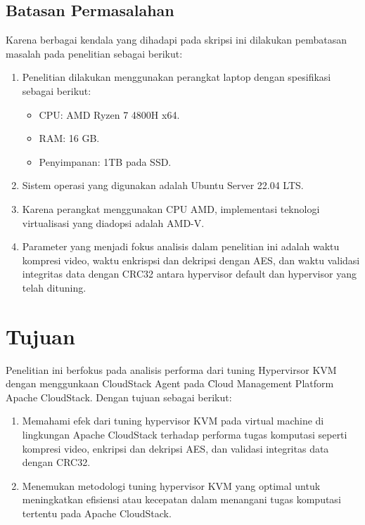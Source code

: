 \subsection{Batasan Permasalahan}
Karena berbagai kendala yang dihadapi pada skripsi ini dilakukan pembatasan masalah pada penelitian  sebagai berikut:
\begin{enumerate}
      \item Penelitian dilakukan menggunakan perangkat laptop dengan spesifikasi sebagai berikut:
            \begin{itemize}
                  \item CPU: AMD Ryzen 7 4800H x64.
                  \item RAM: 16 GB.
                  \item Penyimpanan: 1TB pada SSD.
            \end{itemize}
      \item Sistem operasi yang digunakan adalah Ubuntu Server 22.04 LTS.
      \item Karena perangkat menggunakan CPU AMD, implementasi teknologi virtualisasi yang diadopsi adalah AMD-V.
      \item Parameter yang menjadi fokus analisis dalam penelitian ini adalah waktu kompresi video, waktu enkrispsi dan dekripsi dengan AES, dan waktu validasi integritas data dengan CRC32 antara hypervisor default dan hypervisor yang telah dituning.
\end{enumerate}


\section{Tujuan}
Penelitian ini berfokus pada analisis performa dari tuning Hypervirsor KVM dengan menggunkaan CloudStack Agent pada \f{Cloud Management Platform} Apache CloudStack. Dengan tujuan sebagai berikut:

\begin{enumerate}
      \item  Memahami efek dari tuning hypervisor KVM pada virtual machine di lingkungan Apache CloudStack terhadap performa tugas komputasi seperti kompresi video, enkripsi dan dekripsi AES, dan validasi integritas data dengan CRC32.

      \item Menemukan metodologi tuning hypervisor KVM yang optimal untuk meningkatkan efisiensi atau kecepatan dalam menangani tugas komputasi tertentu pada Apache CloudStack.

\end{enumerate}

